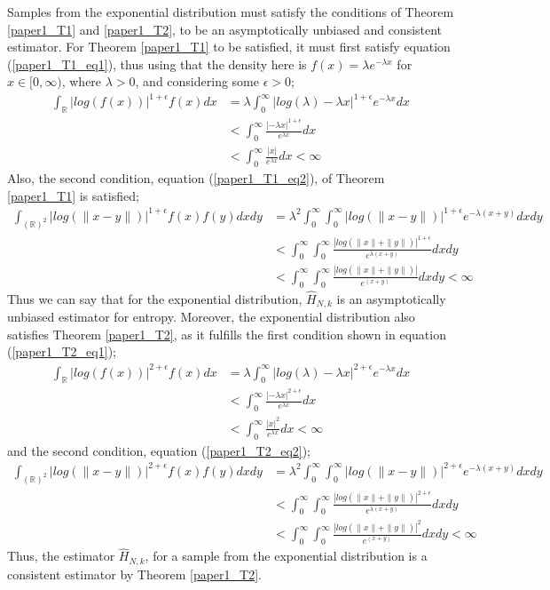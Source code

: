 \documentclass{article}
\begin{document}
Samples from the exponential distribution must satisfy the conditions of Theorem \ref{paper1_T1} and \ref{paper1_T2}, to  be an asymptotically unbiased and consistent estimator. For Theorem \ref{paper1_T1} to be satisfied, it must first satisfy equation (\ref{paper1_T1_eq1}), thus using that the density here is $f(x) = \lambda e^{-\lambda x}$ for $x \in [0, \infty)$, where $\lambda >0$, and considering some $\epsilon >0$;
\begin{align} \nonumber
\int_{\mathbb{R}} | log(f(x))|^{1 + \epsilon} f(x) dx  &= \lambda \int_{0}^{\infty} | log (\lambda) - \lambda x |^{1 + \epsilon} e^{- \lambda x} dx \\ \nonumber
&<  \int_{0}^{\infty} \frac{| - \lambda x |^{1 + \epsilon}}{ e^{\lambda x}} dx \\ \nonumber
&<  \int_{0}^{\infty} \frac{|x|}{ e^{\lambda x}} dx < \infty \nonumber
\end{align}
Also, the second condition, equation (\ref{paper1_T1_eq2}), of Theorem \ref{paper1_T1} is satisfied;
\begin{align} \nonumber
\int_{(\mathbb{R})^2} | log(\|x-y\|)|^{1+ \epsilon} f(x) f(y) dx dy  &= \lambda^2 \int_{0}^{\infty} \int_{0}^{\infty} | log(\|x-y\|)|^{1+ \epsilon} e^{- \lambda (x + y)} dx dy \\ \nonumber
&<  \int_{0}^{\infty} \int_{0}^{\infty}  \frac{| log(\|x\| + \|y\|)|^{1+ \epsilon}}{e^{\lambda (x + y)}} dx dy \\ \nonumber
&<  \int_{0}^{\infty} \int_{0}^{\infty}  \frac{| log(\|x\| + \|y\|)|}{e^{(x + y)}} dx dy < \infty  \nonumber
\end{align}
Thus we can say that for the exponential distribution, $\hat{H}_{N,k}$ is an asymptotically unbiased estimator for entropy. Moreover, the exponential distribution also satisfies Theorem \ref{paper1_T2}, as it fulfills the first condition shown in equation (\ref{paper1_T2_eq1});
\begin{align} \nonumber
\int_{\mathbb{R}} | log(f(x))|^{2 + \epsilon} f(x) dx  &= \lambda \int_{0}^{\infty} | log (\lambda) - \lambda x |^{2 + \epsilon} e^{- \lambda x} dx \\ \nonumber
&<  \int_{0}^{\infty} \frac{| - \lambda x |^{2 + \epsilon}}{ e^{\lambda x}} dx \\ \nonumber
&<  \int_{0}^{\infty} \frac{|x|^2}{ e^{\lambda x}} dx < \infty \nonumber
\end{align}
and the second condition, equation (\ref{paper1_T2_eq2});
\begin{align} \nonumber
\int_{(\mathbb{R})^2} | log(\|x-y\|)|^{2+ \epsilon} f(x) f(y) dx dy  &= \lambda^2 \int_{0}^{\infty} \int_{0}^{\infty} | log(\|x-y\|)|^{2+ \epsilon} e^{- \lambda (x + y)} dx dy \\ \nonumber
&<  \int_{0}^{\infty} \int_{0}^{\infty}  \frac{| log(\|x\| + \|y\|)|^{2+ \epsilon}}{e^{\lambda (x + y)}} dx dy \\ \nonumber
&<  \int_{0}^{\infty} \int_{0}^{\infty}  \frac{| log(\|x\| + \|y\|)|^2}{e^{(x + y)}} dx dy < \infty  \nonumber
\end{align}
Thus, the estimator $\hat{H}_{N,k}$, for a sample from the exponential distribution is a consistent estimator by Theorem \ref{paper1_T2}. 
\end{document}
